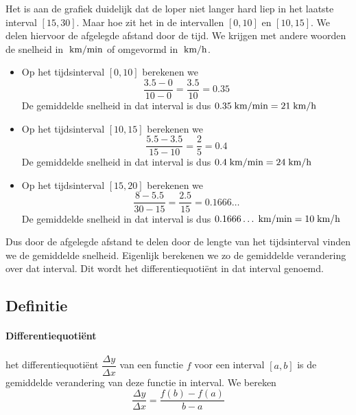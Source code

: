 \documentclass[12pt]{article}
\begin{document}
\begin{theorie}
Het is aan de grafiek duidelijk dat de loper niet langer hard liep in het laatste interval $[15, 30]$. Maar hoe zit het in de intervallen $[0,10]$ en $[10,15]$. We delen hiervoor de afgelegde afstand door de tijd. We krijgen met andere woorden de snelheid in $\;\mbox{km/min}$ of omgevormd in $\;\mbox{km/h}$.

\begin{itemize}
\item Op het tijdsinterval $[0, 10]$ berekenen we
  $$\dfrac{3.5-0}{10-0}=\dfrac{3.5}{10}=0.35$$
  De gemiddelde snelheid in dat interval is dus $0.35 \;\mbox{km/min} = 21 \;\mbox{km/h}$
\item Op het tijdsinterval $[10, 15]$ berekenen we
  $$\dfrac{5.5-3.5}{15-10}=\dfrac{2}{5}=0.4$$
  De gemiddelde snelheid in dat interval is dus $0.4 \;\mbox{km/min} = 24 \;\mbox{km/h}$
\item Op het tijdsinterval $[15, 20]$ berekenen we
  $$\dfrac{8-5.5}{30-15}=\dfrac{2.5}{15}=0.1666\ldots$$
  De gemiddelde snelheid in dat interval is dus $0.1666\ldots \;\mbox{km/min} = 10 \;\mbox{km/h}$
\end{itemize}

Dus door de afgelegde afstand te delen door de lengte van het tijdsinterval vinden we de gemiddelde snelheid. Eigenlijk berekenen we zo de gemiddelde verandering over dat interval. Dit wordt het differentiequotiënt in dat interval genoemd.

\subsection{Definitie}

\paragraph{Differentiequotiënt}
\begin{mdframed}
  het differentiequotiënt $\dfrac{\Delta y}{\Delta x}$ van een functie $f$ voor een interval $[a, b]$ is de gemiddelde verandering van deze functie in interval. We bereken
  $$\dfrac{\Delta y}{\Delta x}=\dfrac{f(b)-f(a)}{b-a}$$
\end{mdframed}



\end{theorie}
\end{document}
